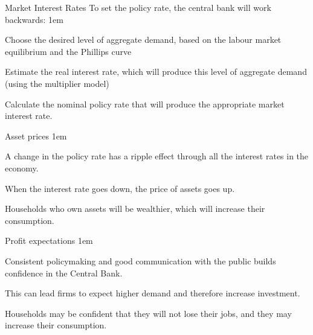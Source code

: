 \documentclass[11pt,aspectratio=43,usenames,dvipsnames]{beamer}
\let\olditemize=\itemize
\let\endolditemize=\enditemize
\renewenvironment{itemize}{\olditemize \itemsep1em}{\endolditemize}
\let\oldenumerate=\enumerate
\let\endoldenumerate=\endenumerate
\renewenvironment{enumerate}{\oldenumerate \itemsep1em}{ \endoldenumerate}
\theoremstyle{definition}
\begin{document}
\begin{frame}{Market Interest Rates}
\label{slide:Market_Interest_Rates}
    To set the policy rate, the central bank will work backwards:
    \begin{enumerate}
        \item Choose the desired level of aggregate demand, based on the labour market equilibrium and the Phillips curve
        \item Estimate the real interest rate, which will produce this level of aggregate demand (using the multiplier model)
        \item Calculate the nominal policy rate that will produce the appropriate market interest rate.
    \end{enumerate}


\end{frame}

\begin{frame}{Asset prices}
\label{slide:Asset_prices}
    \begin{itemize}
        \item A change in the policy rate has a ripple effect through all the interest rates in the economy.
        \item When the interest rate goes down, the price of assets goes up.
        \item Households who own assets will be wealthier, which will increase their consumption.
    \end{itemize}

\end{frame}

\begin{frame}{Profit expectations}
\label{slide:Profit_expectations}
    \begin{itemize}
        \item Consistent policymaking and good communication with the public builds confidence in the Central Bank.
        \item This can lead firms to expect higher demand and therefore increase investment.
        \item Households may be confident that they will not lose their jobs, and they may increase their consumption.
    \end{itemize}
\end{frame}
\end{document}
